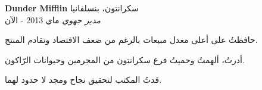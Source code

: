 \foreignlanguage{english}{\textbf{Dunder Mifflin}} \hfill سكرانتون، بنسلفانيا\\
\textit{مدير جهوي} \hfill ماي 2013 - الآن\\
\vspace*{-4pt}
\begin{achievements}
	\item حافظتُ على أعلى معدل مبيعات بالرغم من ضعف الاقتصاد وتقادم المنتج.
	\item أدرتُ، ألهمتُ وحميتُ فرع سكرانتون من المجرمين وحيوانات الرّاكون.
	\item قدتُ المكتب لتحقيق نجاح ومجد لا حدود لهما.
\end{achievements}
